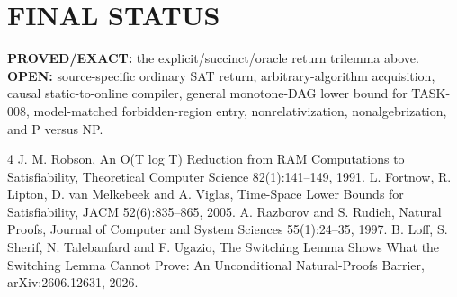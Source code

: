 \documentclass[11pt]{article}
\begin{document}
\section*{FINAL STATUS}
\textbf{PROVED/EXACT:} the explicit/succinct/oracle return trilemma above. \textbf{OPEN:} source-specific ordinary SAT return, arbitrary-algorithm acquisition, causal static-to-online compiler, general monotone-DAG lower bound for TASK-008, model-matched forbidden-region entry, nonrelativization, nonalgebrization, and P versus NP.

\begin{thebibliography}{4}
 J. M. Robson, An O(T log T) Reduction from RAM Computations to Satisfiability, Theoretical Computer Science 82(1):141--149, 1991.
 L. Fortnow, R. Lipton, D. van Melkebeek and A. Viglas, Time-Space Lower Bounds for Satisfiability, JACM 52(6):835--865, 2005.
 A. Razborov and S. Rudich, Natural Proofs, Journal of Computer and System Sciences 55(1):24--35, 1997.
 B. Loff, S. Sherif, N. Talebanfard and F. Ugazio, The Switching Lemma Shows What the Switching Lemma Cannot Prove: An Unconditional Natural-Proofs Barrier, arXiv:2606.12631, 2026.
\end{thebibliography}
\end{document}
